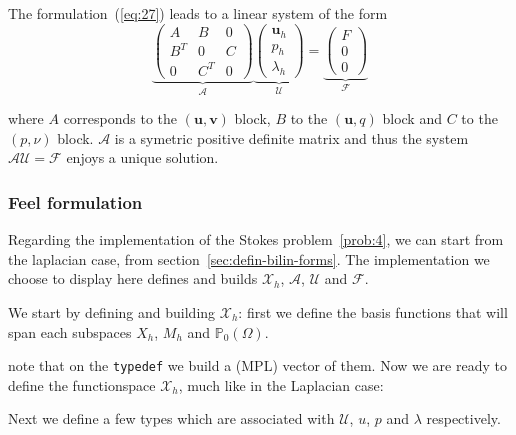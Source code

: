 The formulation~(\ref{eq:27}) leads to a linear system of the form
\begin{equation}
  \label{eq:28}
  \underbrace{\begin{pmatrix}
    A & B & 0\\
    B^T & 0 & C\\
    0 & C^T & 0
  \end{pmatrix}}_{\mathcal{A}}
\underbrace{
  \begin{pmatrix}
    \mathbf{u}_h\\
    p_h\\
    \lambda_h
  \end{pmatrix}}_{\mathcal{U}} =
\underbrace{\begin{pmatrix}
    F\\
    0\\
    0
  \end{pmatrix}}_{\mathcal{F}}
\end{equation}

where $A$ corresponds to the $(\mathbf{u},\mathbf{v})$ block, $B$ to
the $(\mathbf{u},q)$ block and $C$ to the $(p,\nu)$
block. $\mathcal{A}$ is a symetric positive definite matrix and thus
the system $\mathcal{A} \mathcal{U} = \mathcal{F}$ enjoys a unique
solution.

\subsubsection{Feel formulation}
\label{sec:feel-formulation}

Regarding the implementation of the Stokes problem~\ref{prob:4}, we
can start from the laplacian case, from
section~\ref{sec:defin-bilin-forms}. The implementation we choose to
display here defines and builds $\mathcal{X}_h$, $\mathcal{A}$,
$\mathcal{U}$ and $\mathcal{F}$.

We start by defining and building $\mathcal{X}_h$: first we define the
basis functions that will span each subspaces $X_h$, $M_h$ and
$\mathbb{P}_0(\Omega)$.



note that on the \lstinline!typedef! we build a (MPL) vector of them. Now we are
ready to define the functionspace $\mathcal{X}_h$, much like in the
Laplacian case:



Next we define a few types which are associated with $\mathcal{U}$,
$u$, $p$ and $\lambda$ respectively.


